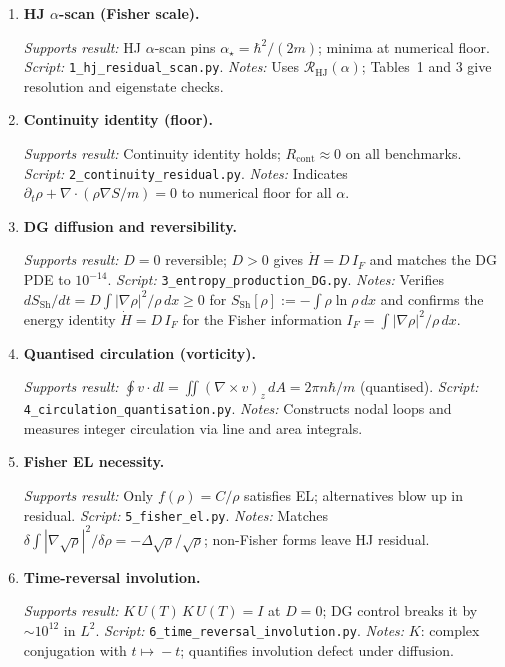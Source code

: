 \documentclass[11pt,a4paper]{article}
\numberwithin{equation}{section}
\theoremstyle{thmcompact}
\theoremstyle{remark}
\begin{document}
	\begin{enumerate}[leftmargin=1.25em,label=\textbf{Test~\arabic*:},itemsep=1em]
		\item \textbf{HJ $\alpha$-scan (Fisher scale).}
		
		\emph{Supports result:} HJ $\alpha$-scan pins $\alpha_\star=\hbar^{2}/(2m)$; minima at numerical floor.
		\emph{Script:} \texttt{1\_hj\_residual\_scan.py}.
		\emph{Notes:} Uses $\mathcal{R}_{\mathrm{HJ}}(\alpha)$; Tables~1 and 3 give resolution and eigenstate checks.
		
		\item \textbf{Continuity identity (floor).}
		
		\emph{Supports result:} Continuity identity holds; $R_{\mathrm{cont}}\approx 0$ on all benchmarks.
		\emph{Script:} \texttt{2\_continuity\_residual.py}.
		\emph{Notes:} Indicates $\partial_t\rho+\nabla\!\cdot(\rho\nabla S/m)=0$ to numerical floor for all $\alpha$.
		
\item \textbf{DG diffusion and reversibility.}

\emph{Supports result:} $D=0$ reversible; $D>0$ gives $\dot H=D\,I_F$ and matches the DG PDE to $10^{-14}$.
\emph{Script:} \texttt{3\_entropy\_production\_DG.py}.
\emph{Notes:} Verifies $dS_{\mathrm{Sh}}/dt=D\!\int |\nabla\rho|^2/\rho\,dx\ge0$ for $S_{\mathrm{Sh}}[\rho]:=-\int\rho\ln\rho\,dx$ and confirms the energy identity $\dot H=D\,I_F$ for the Fisher information $I_F=\int |\nabla\rho|^{2}/\rho\,dx$.
		
		\item \textbf{Quantised circulation (vorticity).}
		
		\emph{Supports result:} $\oint v\!\cdot dl=\iint(\nabla\times v)_z\,dA=2\pi n\hbar/m$ (quantised).
		\emph{Script:} \texttt{4\_circulation\_quantisation.py}.
		\emph{Notes:} Constructs nodal loops and measures integer circulation via line and area integrals.
		
		\item \textbf{Fisher EL necessity.}
		
		\emph{Supports result:} Only $f(\rho)=C/\rho$ satisfies EL; alternatives blow up in residual.
		\emph{Script:} \texttt{5\_fisher\_el.py}.
		\emph{Notes:} Matches $\delta\!\int|\nabla\sqrt{\rho}|^2/\delta\rho=-\Delta\sqrt{\rho}/\sqrt{\rho}$; non-Fisher forms leave HJ residual.
		
		\item \textbf{Time-reversal involution.}
		
		\emph{Supports result:} $K\,U(T)\,K\,U(T)=I$ at $D=0$; DG control breaks it by $\sim 10^{12}$ in $L^2$.
		\emph{Script:} \texttt{6\_time\_reversal\_involution.py}.
		\emph{Notes:} $K$: complex conjugation with $t\!\mapsto\!-t$; quantifies involution defect under diffusion.
		

\end{enumerate}
\end{document}
